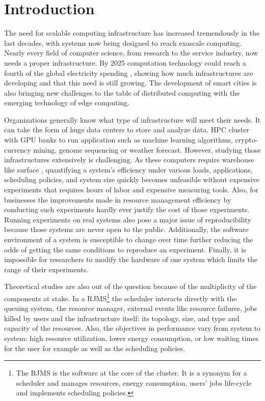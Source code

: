 \chapter{Introduction}

The need for scalable computing infrastructure has increased tremendously in
the last decades, with systems now being designed to reach exascale computing.
Nearly every field of computer science, from research to the service industry,
now needs a proper infrastructure. By 2025 computation technology could reach a
fourth of the global electricity spending \cite{andrae2017total}, showing how
much infrastructures are developing and that this need is still growing. The
development of smart cities is also bringing new challenges to the table of
distributed computing with the emerging technology of edge computing.

Organizations generally know what type of infrastructure will meet their needs.
It can take the form of huge data centers to store and analyze data, HPC
cluster with GPU banks to run application such as machine learning algorithms,
crypto-currency mining, genome sequencing or weather forecast.  However,
studying those infrastructures extensively is challenging.  As these computers
require warehouse like surface \cite{barroso2018datacenter}, quantifying a
system's efficiency under various loads, applications, scheduling policies, and
system size quickly becomes unfeasible without expensive experiments that
requires hours of labor and expensive measuring tools. Also, for businesses the
improvements made in resource management efficiency by conducting such
experiments hardly ever justify the cost of those experiments. Running
experiments on real systems also pose a major issue of reproducibility because
those systems are never open to the public. Additionally, the software
environment of a system is susceptible to change over time further reducing the
odds of getting the same conditions to reproduce an experiment. Finally, it is
impossible for researchers to modify the hardware of one system which limits
the range of their experiments.

Theoretical studies are also out of the question because of the multiplicity of
the components at stake. In a RJMS\footnote{The RJMS is the software at the
core of the cluster. It is a synonym for a scheduler and manages resources,
energy consumption, users' jobs life-cycle and implements scheduling policies.}
the scheduler interacts directly with the queuing system, the resource manager,
external events like resource failures, jobs killed by users and the
infrastructure itself: its topology, size, and type and capacity of the
resources. Also, the objectives in performance vary from system to system: high
resource utilization, lower energy consumption, or low waiting times for the
user for example as well as the scheduling policies. \\



